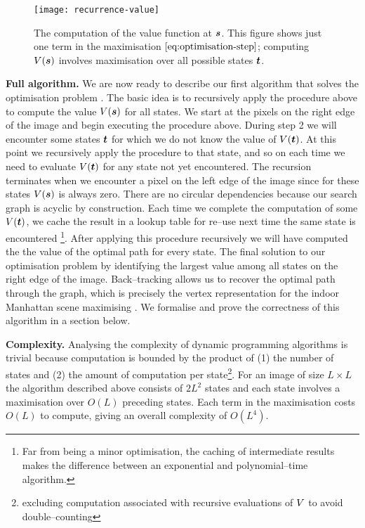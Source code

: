 \begin{figure}[tb]
  \centering
  \texttt{[image: recurrence-value]}
  \caption{The computation of the value function at $\State$. This
    figure shows just one term in the maximisation
    $\eqnref{optimisation-step}$; computing $\bestvalue(\State)$
    involves maximisation over all possible states $\OtherState$.}
  \label{fig:recurrence-value}
\end{figure}

\textbf{Full algorithm.} We are now ready to describe our first
algorithm that solves the optimisation problem . The
basic idea is to recursively apply the procedure above to compute the
value $\bestvalue(\State)$ for all states. We start at the pixels on
the right edge of the image and begin executing the procedure
above. During step 2 we will encounter some states $\OtherState$ for
which we do not know the value of $\bestvalue(\OtherState)$. At this
point we recursively apply the procedure to that state, and so on each
time we need to evaluate $\bestvalue(\OtherState)$ for any state not
yet encountered. The recursion terminates when we encounter a pixel on
the left edge of the image since for these states $\bestvalue(\State)$
is always zero. There are no circular dependencies because our search
graph is acyclic by construction. Each time we complete the
computation of some $\bestvalue(\OtherState)$, we cache the result in
a lookup table for re--use next time the same state is
encountered \footnote{Far from being a minor optimisation, the caching
  of intermediate results makes the difference between an exponential
  and polynomial--time algorithm.}. After applying this procedure
recursively we will have computed the the value of the optimal path
for every state. The final solution to our optimisation problem  by identifying the largest value among all states on the
right edge of the image. Back--tracking allows us to recover the
optimal path through the graph, which is precisely the vertex
representation for the indoor Manhattan scene maximising
. We formalise and prove the correctness of this
algorithm in a section below.

\textbf{Complexity.} Analysing the complexity of dynamic programming
algorithms is trivial because computation is bounded by the product of
(1) the number of states and (2) the amount of computation per
state\footnote{excluding computation associated with recursive
  evaluations of $\bestvalue$ to avoid double--counting}. For an image
of size $L \times L$ the algorithm described above consists of $2L^2$
states and each state involves a maximisation over $O(L)$ preceding
states. Each term in the maximisation costs $O(L)$ to compute, giving
an overall complexity of $O(L^4)$.


